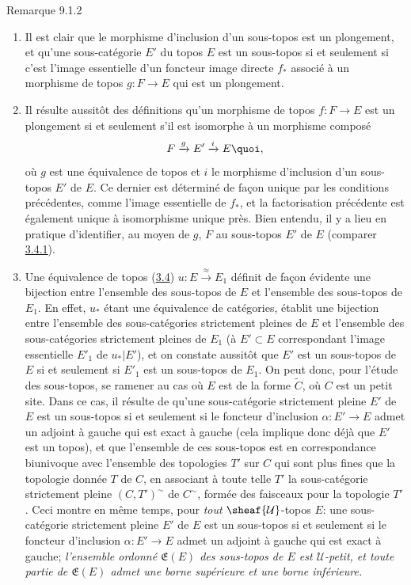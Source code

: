 \begin{enonce*}[remark]{Remarque 9.1.2}
\begin{enumerate}
\renewcommand{\theenumi}{\alph{enumi}}
\renewcommand{\labelenumi}{\theenumi)}
\item Il est clair que le morphisme d'inclusion d'un sous-topos est un
plongement, et qu'une sous-catégorie $E'$ du topos $E$ est un
sous-topos si et seulement si c'est l'image essentielle d'un
foncteur image directe $f_{\ast}$ associé à un morphisme de topos
$g:F\rightarrow E$ qui est un plongement.

\item Il résulte aussitôt des définitions qu'un morphisme de topos
$f:F\rightarrow E$ est un plongement si et seulement s'il est
isomorphe à un morphisme composé
$$
F\xrightarrow{g}E'\xrightarrow{i}E{\quoi},
$$
où $g$ est une équivalence de topos et $i$ le morphisme d'inclusion
d'un sous-topos $E'$ de $E$. Ce dernier est déterminé de façon
unique par les conditions précédentes, comme l'image essentielle de
$f_{\ast}$, et la factorisation précédente est également unique à
isomorphisme unique près. Bien entendu, il y a lieu en pratique
d'identifier, au moyen de $g$, $F$ au sous-topos $E'$ de $E$
(comparer \hyperref[IV.subsubsec3.4.1]{3.4.1}).

\item Une équivalence de topos (\hyperref[IV.subsec3.4]{3.4})
  $u:E\xrightarrow{\approx}E_1$
définit de façon évidente une bijection entre l'ensemble des
sous-topos de $E$ et l'ensemble des sous-topos de $E_1$. En effet,
$u_{\ast}$ étant une équivalence de catégories,\pageoriginale
établit une bijection entre l'ensemble des sous-catégories
strictement pleines de $E$ et l'ensemble des sous-catégories
strictement pleines de $E_1$ (à $E'\subset E$ correspondant l'image
essentielle $E'_1$ de $u_{\ast}| E'$), et on constate aussitôt que
$E'$ est un sous-topos de $E$ si et seulement si $E'_1$ est un
sous-topos de $E_1$. On peut donc, pour l'étude des sous-topos, se
ramener au cas où $E$ est de la forme $\widetilde{C}$, où $C$ est un
petit site. Dans ce cas, il résulte de  qu'une
sous-catégorie strictement pleine $E'$ de $E$ est un sous-topos si
et seulement si le foncteur d'inclusion $\alpha:E'\rightarrow E$
admet un adjoint à gauche qui est exact à gauche (cela implique donc
déjà que $E'$ est un topos), et que l'ensemble de ces sous-topos est
en correspondance biunivoque avec l'ensemble des topologies $T'$ sur
$C$ qui sont plus fines que la topologie donnée $T$ de $C$, en
associant à toute telle $T'$ la sous-catégorie strictement pleine
$(C,T')^{\sim}$ de $C^{\sim}$, formée des faisceaux pour la
topologie $T'$. Ceci montre en même temps, pour \emph{tout}
$\sheaf{\mathcal{U}}$-topos $E$: une sous-catégorie strictement
pleine $E'$ de $E$ est un sous-topos si et seulement si le foncteur
d'inclusion $\alpha:E'\rightarrow E$ admet un adjoint à gauche qui
est exact à gauche; \emph{l'ensemble ordonné $\mathfrak{E}(E)$ des
sous-topos de $E$ est $\mathcal{U}$-petit, et toute partie de
$\mathfrak{E}(E)$ admet une borne supérieure et une borne
inférieure.}


\end{enumerate}
\end{enonce*}
